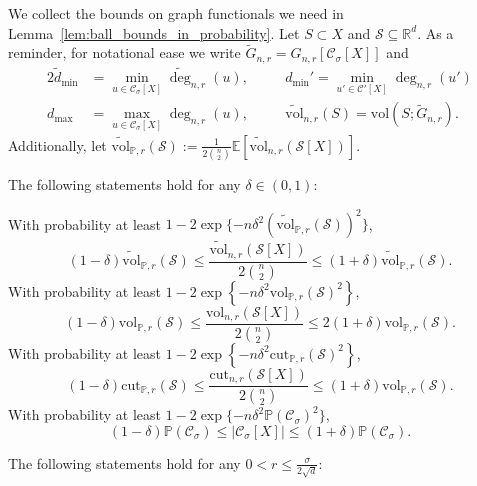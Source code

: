 \documentclass[11pt,twoside]{article}
\newcommand{\set}[1]{\left\{#1\right\}}
\newcommand{\vol}{\mathrm{vol}}
\newcommand{\cut}{\mathrm{cut}}
\newcommand{\abs}[1]{\left \lvert #1 \right \rvert}
\newcommand{\Reals}{\mathbb{R}}
\newcommand{\Rd}{\Reals^d}
\newcommand{\1}{\mathbbm{1}}
\newcommand{\Xbf}{X}
\newcommand{\Pbb}{\mathbb{P}}
\newcommand{\Sset}{\mathcal{S}}
\newcommand{\Cset}{\mathcal{C}}
\newcommand{\Csig}{\Cset_{\sigma}}
\begin{document}
We collect the bounds on graph functionals we need in Lemma~\ref{lem:ball_bounds_in_probability}. Let $S \subset X$ and $\mathcal{S} \subseteq \Rd$. As a reminder, for notational ease we write $\widetilde{G}_{n,r} = G_{n,r}[\Csig[\Xbf]]$ and
\begin{alignat*}{2}
\widetilde{d}_{\min} & = \min_{u \in \Csig[\Xbf]} \widetilde{\deg}_{n,r}(u), \quad && d_{\min}' = \min_{u' \in \Cset'[\Xbf]} {\deg}_{n,r}(u') \\
d_{\max} & = \max_{u \in \Csig[\Xbf]} \deg_{n,r}(u), \quad && \widetilde{\vol}_{n,r}(S) = \vol(S; \widetilde{G}_{n,r}). 
\end{alignat*}
Additionally, let $\widetilde{\vol}_{\Pbb,r}(\mathcal{S}) := \frac{1}{2{n \choose 2}}\mathbb{E}[\widetilde{\vol}_{n,r}(\mathcal{S}[\Xbf])]$.
\begin{lemma}
	\label{lem:ball_bounds_in_probability} \label{lem:graph_functional_concentration}
	\item[]
	The following statements hold for any $\delta \in (0,1)$:
	
	\noindent With probability at least $1 - 2\exp\{-n\delta^2(\widetilde{\vol}_{\Pbb,r}(\mathcal{S}))^2\}$,
	\begin{equation}
	\label{eqn:volwt_bound}
	(1 - \delta) \widetilde{\vol}_{\Pbb,r}(\mathcal{S}) \leq \frac{\widetilde{\vol}_{n,r}(\mathcal{S}[\Xbf])}{2{n \choose 2}} \leq (1 + \delta) \widetilde{\vol}_{\Pbb,r}(\mathcal{S}).
	\end{equation}
	With probability at least $1 - 2\exp\set{-n \delta^2 \vol_{\Pbb,r}(\Sset)^2}$,
	\begin{equation}
	\label{eqn:vol_bound}
	(1 - \delta)\vol_{\Pbb,r}(\Sset) \leq \frac{\vol_{n,r}(\Sset[\Xbf])}{2{n \choose 2}}\leq 2(1 + \delta)\vol_{\Pbb,r}(\Sset).
	\end{equation}
	With probability at least $1 - 2\exp\set{-n \delta^2 \cut_{\Pbb,r}(\Sset)^2}$,
	\begin{equation}
	\label{eqn:cut_bound}
	(1 - \delta)\cut_{\Pbb,r}(\Sset) \leq \frac{\cut_{n,r}(\Sset[\Xbf])}{2{n \choose 2}}\leq (1 + \delta)\vol_{\Pbb,r}(\Sset).
	\end{equation}
	With probability at least $1 - 2\exp\{-n\delta^2\Pbb(\Csig)^2\}$, 
	\begin{equation}
	\label{eqn:cardinality}
	(1 - \delta) \Pbb(\Csig) \leq \abs{\Csig[\Xbf]} \leq (1 + \delta) \Pbb(\Csig).
	\end{equation}
	
	\noindent The following statements hold for any $0 < r \leq \frac{\sigma}{2\sqrt{d}}$:
	

\end{lemma}
\end{document}
